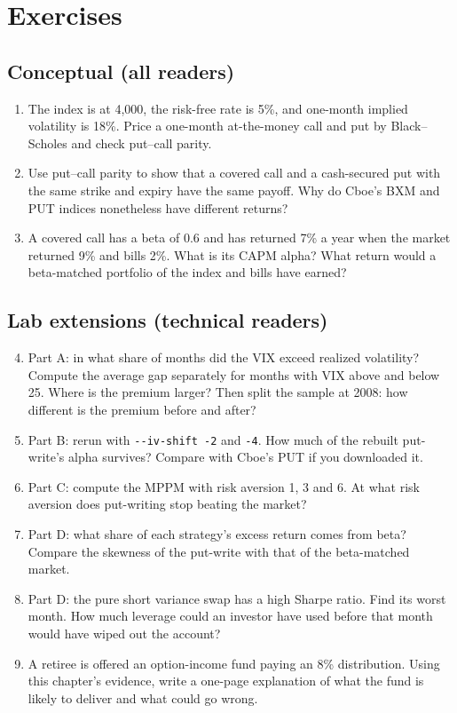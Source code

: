 \section*{Exercises}

\subsection*{Conceptual (all readers)}

\begin{enumerate}
  \item The index is at 4,000, the risk-free rate is 5\%, and one-month implied volatility is 18\%. Price a one-month at-the-money call and put by Black--Scholes and check put--call parity.
  \item Use put--call parity to show that a covered call and a cash-secured put with the same strike and expiry have the same payoff. Why do Cboe's BXM and PUT indices nonetheless have different returns?
  \item A covered call has a beta of 0.6 and has returned 7\% a year when the market returned 9\% and bills 2\%. What is its CAPM alpha? What return would a beta-matched portfolio of the index and bills have earned?
\end{enumerate}

\subsection*{Lab extensions (technical readers)}

\begin{enumerate}
  \setcounter{enumi}{3}
  \item Part A: in what share of months did the VIX exceed realized volatility? Compute the average gap separately for months with VIX above and below 25. Where is the premium larger? Then split the sample at 2008: how different is the premium before and after?
  \item Part B: rerun with \texttt{-{}-iv-shift -2} and \texttt{-4}. How much of the rebuilt put-write's alpha survives? Compare with Cboe's PUT if you downloaded it.
  \item Part C: compute the MPPM with risk aversion 1, 3 and 6. At what risk aversion does put-writing stop beating the market?
  \item Part D: what share of each strategy's excess return comes from beta? Compare the skewness of the put-write with that of the beta-matched market.
  \item Part D: the pure short variance swap has a high Sharpe ratio. Find its worst month. How much leverage could an investor have used before that month would have wiped out the account?
  \item A retiree is offered an option-income fund paying an 8\% distribution. Using this chapter's evidence, write a one-page explanation of what the fund is likely to deliver and what could go wrong.
\end{enumerate}
